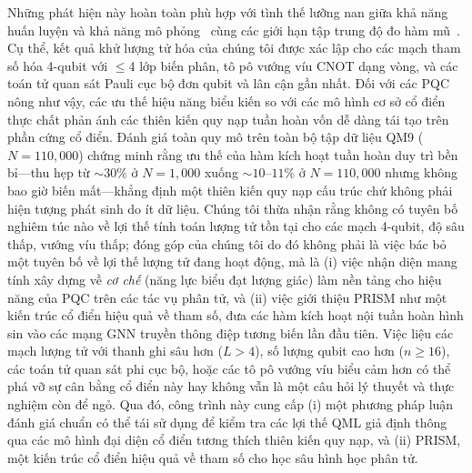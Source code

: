 \documentclass[10pt,twocolumn,letterpaper]{article}
\begin{document}
Những phát hiện này hoàn toàn phù hợp với tình thế lưỡng nan giữa khả năng huấn luyện và khả năng mô phỏng~\cite{Cerezo:2023nqf} cùng các giới hạn tập trung độ đo hàm mũ~\cite{Thanasilp:2022agd}. Cụ thể, kết quả khử lượng tử hóa của chúng tôi được xác lập cho các mạch tham số hóa 4-qubit với $\le$4 lớp biến phân, tô pô vướng víu CNOT dạng vòng, và các toán tử quan sát Pauli cục bộ đơn qubit và lân cận gần nhất. Đối với các PQC nông như vậy, các ưu thế hiệu năng biểu kiến so với các mô hình cơ sở cổ điển thực chất phản ánh các thiên kiến quy nạp tuần hoàn vốn dễ dàng tái tạo trên phần cứng cổ điển. Đánh giá toàn quy mô trên toàn bộ tập dữ liệu QM9 ($N = 110{,}000$) chứng minh rằng ưu thế của hàm kích hoạt tuần hoàn duy trì bền bỉ---thu hẹp từ $\sim 30\%$ ở $N = 1{,}000$ xuống $\sim 10$--$11\%$ ở $N = 110{,}000$ nhưng không bao giờ biến mất---khẳng định một thiên kiến quy nạp cấu trúc chứ không phải hiện tượng phát sinh do ít dữ liệu.
Chúng tôi thừa nhận rằng không có tuyên bố nghiêm túc nào về lợi thế tính toán lượng tử tồn tại cho các mạch 4-qubit, độ sâu thấp, vướng víu thấp; đóng góp của chúng tôi do đó không phải là việc bác bỏ một tuyên bố về lợi thế lượng tử đang hoạt động, mà là (i) việc nhận diện mang tính xây dựng về \textit{cơ chế} (năng lực biểu đạt lượng giác) làm nền tảng cho hiệu năng của PQC trên các tác vụ phân tử, và (ii) việc giới thiệu PRISM như một kiến trúc cổ điển hiệu quả về tham số, đưa các hàm kích hoạt nội tuần hoàn hình sin vào các mạng GNN truyền thông điệp tương biến lần đầu tiên. Việc liệu các mạch lượng tử với thanh ghi sâu hơn ($L > 4$), số lượng qubit cao hơn ($n \ge 16$), các toán tử quan sát phi cục bộ, hoặc các tô pô vướng víu biểu cảm hơn có thể phá vỡ sự cân bằng cổ điển này hay không vẫn là một câu hỏi lý thuyết và thực nghiệm còn để ngỏ.
Qua đó, công trình này cung cấp (i) một phương pháp luận đánh giá chuẩn có thể tái sử dụng để kiểm tra các lợi thế QML giả định thông qua các mô hình đại diện cổ điển tương thích thiên kiến quy nạp, và (ii) PRISM, một kiến trúc cổ điển hiệu quả về tham số cho học sâu hình học phân tử.
\end{document}
